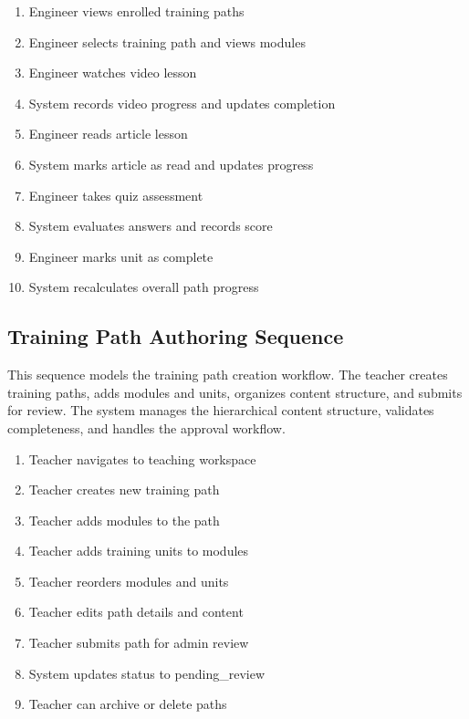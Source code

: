 \begin{enumerate}[topsep=0pt,itemsep=1pt,parsep=0pt,partopsep=0pt]
    \item Engineer views enrolled training paths
    \item Engineer selects training path and views modules
    \item Engineer watches video lesson
    \item System records video progress and updates completion
    \item Engineer reads article lesson
    \item System marks article as read and updates progress
    \item Engineer takes quiz assessment
    \item System evaluates answers and records score
    \item Engineer marks unit as complete
    \item System recalculates overall path progress
\end{enumerate}


\subsection{Training Path Authoring Sequence}
This sequence models the training path creation workflow. The teacher creates
training paths, adds modules and units, organizes content structure, and
submits for review. The system manages the hierarchical content structure,
validates completeness, and handles the approval workflow.

\begin{enumerate}[topsep=0pt,itemsep=1pt,parsep=0pt,partopsep=0pt]
    \item Teacher navigates to teaching workspace
    \item Teacher creates new training path
    \item Teacher adds modules to the path
    \item Teacher adds training units to modules
    \item Teacher reorders modules and units
    \item Teacher edits path details and content
    \item Teacher submits path for admin review
    \item System updates status to pending\_review
    \item Teacher can archive or delete paths
\end{enumerate}

